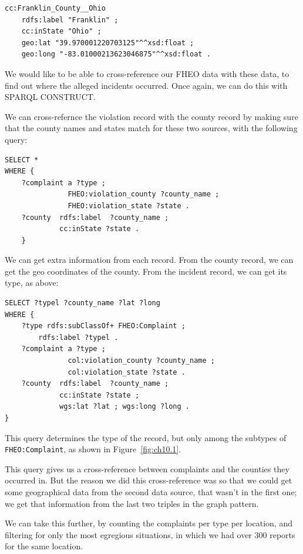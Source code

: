 \begin{lstlisting}
cc:Franklin_County__Ohio	
    rdfs:label "Franklin" ;
    cc:inState "Ohio" ;
	geo:lat "39.970001220703125"^^xsd:float ;
	geo:long "-83.01000213623046875"^^xsd:float .
\end{lstlisting}

We would like to be able to cross-reference our FHEO data with these
data, to find out where the alleged incidents occurred. Once again, we
can do this with SPARQL CONSTRUCT.

We can cross-refernce the violation record with the county record by 
making sure that the county names and states match for these two sources, with the following
query:

\begin{lstlisting}
SELECT *
WHERE {
    ?complaint a ?type ;
               FHEO:violation_county ?county_name ;
               FHEO:violation_state ?state .
    ?county  rdfs:label  ?county_name ;
             cc:inState ?state .
    }
\end{lstlisting}

We can get extra information from each record.  From the county record, 
we can get the geo coordinates of the county.  From the incident record, we can get 
its type, as above:

\begin{lstlisting}
SELECT ?typel ?county_name ?lat ?long 
WHERE {    
    ?type rdfs:subClassOf+ FHEO:Complaint ;
        rdfs:label ?typel .
    ?complaint a ?type ;
               col:violation_county ?county_name ;
               col:violation_state ?state .
    ?county  rdfs:label  ?county_name ;
             cc:inState ?state ;
             wgs:lat ?lat ; wgs:long ?long .
}
\end{lstlisting}

This query determines the type of the record, but only among the subtypes
of \texttt{FHEO:Complaint}, as shown in Figure~\ref{fig:ch10.1}.

This query gives us a cross-reference between complaints and the
counties they occurred in. But the reason we did this cross-reference
was so that we could get some geographical data from the second
data source, that wasn't in the first one; we get that information from
the last two triples in the graph pattern.

We can take this further, by counting the complaints per type per location, 
and filtering for only the most egregious situations, in which we had 
over 300 reports for the same location.  

